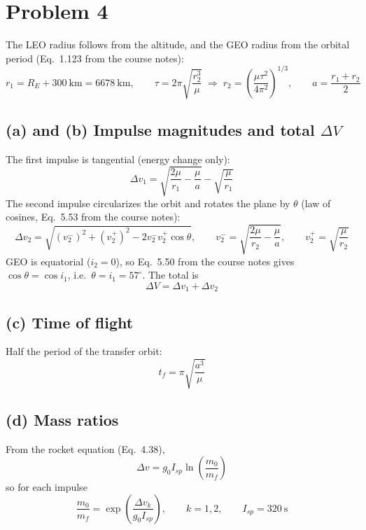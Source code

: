 \section{Problem 4}
\label{sec:problem4}

The LEO radius follows from the altitude, and the GEO radius from the orbital period (Eq.~1.123 from the course notes):
\begin{equation*}
r_1 = R_E + 300~\text{km} = 6678~\text{km}, \qquad
\tau = 2\pi\sqrt{\frac{r_2^3}{\mu}} \;\Rightarrow\; r_2 = \left(\frac{\mu \tau^2}{4\pi^2}\right)^{1/3}, \qquad
a = \frac{r_1+r_2}{2}
\end{equation*}

\subsection*{(a) and (b) Impulse magnitudes and total $\Delta V$}

The first impulse is tangential (energy change only):
\begin{equation*}
\Delta v_1 = \sqrt{\frac{2\mu}{r_1}-\frac{\mu}{a}} - \sqrt{\frac{\mu}{r_1}}
\end{equation*}
The second impulse circularizes the orbit and rotates the plane by $\theta$ (law of cosines, Eq.~5.53 from the course notes):
\begin{equation*}
\Delta v_2 = \sqrt{(v_2^-)^2 + (v_2^+)^2 - 2v_2^-v_2^+\cos\theta}, \qquad
v_2^- = \sqrt{\frac{2\mu}{r_2}-\frac{\mu}{a}}, \qquad v_2^+ = \sqrt{\frac{\mu}{r_2}}
\end{equation*}
GEO is equatorial ($i_2=0$), so Eq.~5.50 from the course notes gives $\cos\theta = \cos i_1$, i.e.\ $\theta = i_1 = 57^\circ$. The total is
\begin{equation*}
\boxed{\Delta V = \Delta v_1 + \Delta v_2}
\end{equation*}

\subsection*{(c) Time of flight}
Half the period of the transfer orbit:
\begin{equation*}
t_f = \pi\sqrt{\frac{a^3}{\mu}}
\end{equation*}

\subsection*{(d) Mass ratios}
From the rocket equation (Eq.~4.38),
\begin{equation*}
\Delta v = g_0 I_{sp}\ln\left(\frac{m_0}{m_f}\right)
\end{equation*}
so for each impulse
\begin{equation*}
\frac{m_0}{m_f} = \exp\left(\frac{\Delta v_k}{g_0 I_{sp}}\right), \qquad k = 1,2, \qquad I_{sp} = 320~\text{s}
\end{equation*}

